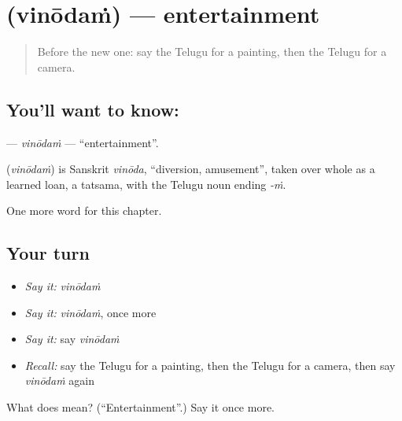 \section[\texorpdfstring{\te{వినోదం} (vinōdaṁ)}{వినోదం (vinōdaṁ)}]{ (vinōdaṁ) — entertainment}

\label{lesson:TE-C230-vinodam}



\begin{quote}
Before the new one: say the Telugu for a painting, then the Telugu for a camera.
\end{quote}

\subsection*{You'll want to know: }
\textbf{} — \emph{vinōdaṁ} — \textquotedblleft{}entertainment\textquotedblright{}.

\begin{cousinweb}
\textbf{} (\emph{vinōdaṁ}) is Sanskrit \emph{vinōda}, \textquotedblleft{}diversion, amusement\textquotedblright{}, taken over whole as a learned loan, a tatsama, with the Telugu noun ending \emph{-ṁ}.
\end{cousinweb}

\begin{grammarlens}[title={What you've built}]
One more word for this chapter.
\end{grammarlens}

\subsection*{Your turn}
\begin{itemize}
\raggedright
  \item \emph{Say it:} \emph{vinōdaṁ}
  \item \emph{Say it:} \emph{vinōdaṁ}, once more
  \item \emph{Say it:} say \emph{vinōdaṁ}
  \item \emph{Recall:} say the Telugu for a painting, then the Telugu for a camera, then say \emph{vinōdaṁ} again
\end{itemize}

\begin{tcolorbox}[breakable,colback=teal!4,colframe=teal!35!black,title={Before you move on}]
What does  mean? (\textquotedblleft{}Entertainment\textquotedblright{}.) Say it once more.
\end{tcolorbox}
